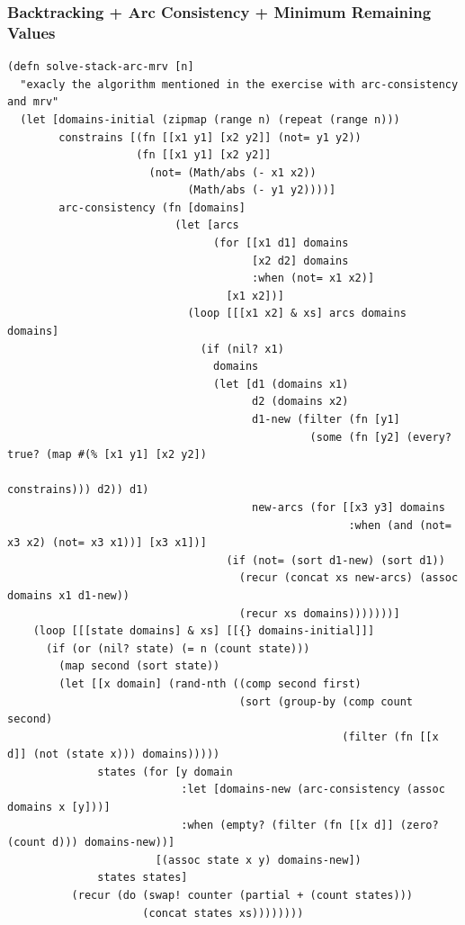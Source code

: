 \documentclass[a4paper,10pt]{article}
\begin{document}
\subsubsection*{Backtracking + Arc Consistency + Minimum Remaining Values}
\begin{lstlisting}
(defn solve-stack-arc-mrv [n]
  "exacly the algorithm mentioned in the exercise with arc-consistency and mrv"
  (let [domains-initial (zipmap (range n) (repeat (range n)))
        constrains [(fn [[x1 y1] [x2 y2]] (not= y1 y2))
                    (fn [[x1 y1] [x2 y2]]
                      (not= (Math/abs (- x1 x2))
                            (Math/abs (- y1 y2))))]
        arc-consistency (fn [domains]
                          (let [arcs
                                (for [[x1 d1] domains
                                      [x2 d2] domains
                                      :when (not= x1 x2)]
                                  [x1 x2])]
                            (loop [[[x1 x2] & xs] arcs domains domains]
                              (if (nil? x1)
                                domains
                                (let [d1 (domains x1)
                                      d2 (domains x2)
                                      d1-new (filter (fn [y1]
                                               (some (fn [y2] (every? true? (map #(% [x1 y1] [x2 y2]) 
                                                                                   constrains))) d2)) d1)
                                      new-arcs (for [[x3 y3] domains
                                                     :when (and (not= x3 x2) (not= x3 x1))] [x3 x1])]
                                  (if (not= (sort d1-new) (sort d1))
                                    (recur (concat xs new-arcs) (assoc domains x1 d1-new))
                                    (recur xs domains)))))))]
    (loop [[[state domains] & xs] [[{} domains-initial]]]
      (if (or (nil? state) (= n (count state)))
        (map second (sort state))
        (let [[x domain] (rand-nth ((comp second first)
                                    (sort (group-by (comp count second)
                                                    (filter (fn [[x d]] (not (state x))) domains)))))
              states (for [y domain
                           :let [domains-new (arc-consistency (assoc domains x [y]))]
                           :when (empty? (filter (fn [[x d]] (zero? (count d))) domains-new))]
                       [(assoc state x y) domains-new])
              states states]
          (recur (do (swap! counter (partial + (count states)))
                     (concat states xs))))))))
\end{lstlisting}
\end{document}
